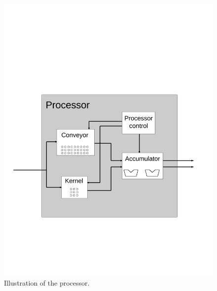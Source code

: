 \begin{figure}[h!]
    \includegraphics[width=\linewidth]{img/processor.png}
    \caption{Illustration of the processor.}
    \label{fig:Convolution}
\end{figure}

